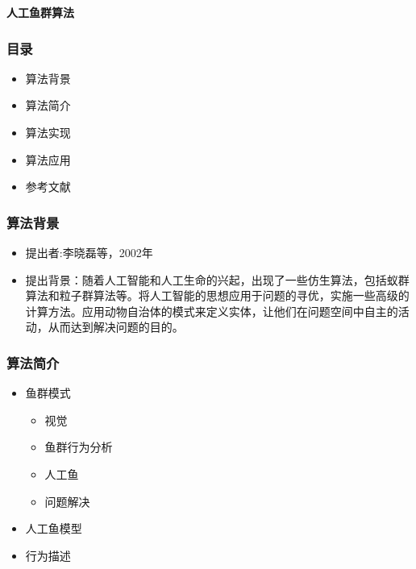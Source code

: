 \begin{frame}
\newcommand{\song}{\setCJKfamilyfont{song}}
\newcommand{\xiaoer}{\fontsize{18pt}{18pt}\selectfont}
	\begin{center}
	{\song\xiaoer\textbf{人工鱼群算法}}
	\end{center}
\end{frame}

\begin{frame}
	\frametitle{目录}
	\begin{itemize}
		\item{算法背景}
		\item{算法简介}
		\item{算法实现}
		\item{算法应用}
		\item{参考文献}
	\end{itemize}
\end{frame}

\begin{frame}
	\frametitle{算法背景}
	\begin{itemize}
		\item{提出者:李晓磊等，2002年}
		\item{提出背景：随着人工智能和人工生命的兴起，出现了一些仿生算法，包括蚁群算法和粒子群算法等。将人工智能的思想应用于问题的寻优，实施一些高级的计算方法。应用动物自治体的模式来定义实体，让他们在问题空间中自主的活动，从而达到解决问题的目的。}
	\end{itemize}
\end{frame}

\begin{frame}
	\frametitle{算法简介}
	\begin{itemize}
		\item{鱼群模式}
			\begin{itemize}
				\item{视觉}
				\item{鱼群行为分析}
				\item{人工鱼}
				\item{问题解决}
			\end{itemize}
		\item{人工鱼模型}
		\item{行为描述}
	\end{itemize}
\end{frame}


